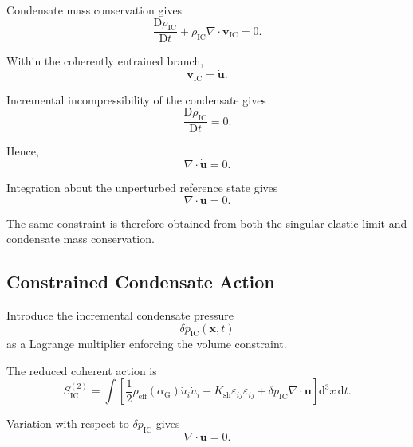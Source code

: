Condensate mass conservation gives
\begin{equation}
    \frac{ \mathrm{D}\rho_{\mathrm{IC}} }{ \mathrm{D}t } + \rho_{\mathrm{IC}} \nabla\cdot\mathbf{v}_{\mathrm{IC}} = 0.
\end{equation}

Within the coherently entrained branch,
\begin{equation}
    \mathbf{v}_{\mathrm{IC}} = \dot{\mathbf{u}}.
\end{equation}

Incremental incompressibility of the condensate gives
\begin{equation}
    \frac{ \mathrm{D}\rho_{\mathrm{IC}} }{ \mathrm{D}t } = 0.
\end{equation}

Hence,
\begin{equation}
    \nabla\cdot\dot{\mathbf{u}} = 0.
\end{equation}

Integration about the unperturbed reference state gives
\begin{equation}
    \boxed{ \nabla\cdot\mathbf{u} = 0 }.
\end{equation}

The same constraint is therefore obtained from both the singular elastic limit and condensate mass conservation.

\subsection{Constrained Condensate Action}

Introduce the incremental condensate pressure
\begin{equation}
    \delta p_{\mathrm{IC}}(\mathbf{x},t)
\end{equation}
as a Lagrange multiplier enforcing the volume constraint.

The reduced coherent action is
\begin{equation}
    \boxed{ S_{\mathrm{IC}}^{(2)} = \int \left[ \frac{1}{2} \rho_{\mathrm{eff}} \left( \alpha_{\mathrm{G}} \right) \dot{u}_i\dot{u}_i - K_{\mathrm{sh}} \varepsilon_{ij}\varepsilon_{ij} + \delta p_{\mathrm{IC}} \nabla\cdot\mathbf{u} \right] \mathrm{d}^3x \, \mathrm{d}t }.
\end{equation}

Variation with respect to $\delta p_{\mathrm{IC}}$ gives
\begin{equation}
    \boxed{ \nabla\cdot\mathbf{u} = 0 }.
\end{equation}

